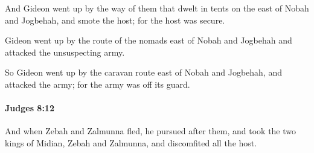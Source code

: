 			\begin{versebox}
					\item[BHS] 
					\item[ASV] And Gideon went up by the way of them that dwelt in tents on the east of Nobah and Jogbehah, and smote the host; for the host was secure.
					\item[NIV] Gideon went up by the route of the nomads east of Nobah and Jogbehah and attacked the unsuspecting army.
					\item[NRSV] So Gideon went up by the caravan route east of Nobah and Jogbehah, and attacked the army; for the army was off its guard.
			\end{versebox}

		\paragraph{Judges 8:12} %
			\label{JUDGES-8-12}

			And when Zebah and Zalmunna fled, he pursued after them, and took the two kings of Midian, Zebah and Zalmunna, and discomfited all the host.

